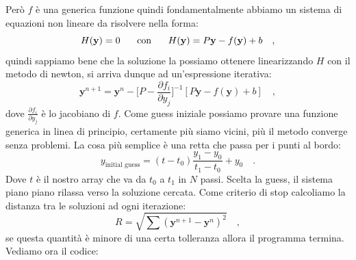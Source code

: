 \documentclass[10pt,a4paper]{article}
\begin{document}
Però $f$ è una generica funzione quindi fondamentalmente abbiamo un sistema di equazioni non lineare da risolvere nella forma:
\begin{equation}
H(\textbf{y}) = 0 \hspace{5 mm} \text{ con } \hspace{5 mm} H(\textbf{y}) = P \textbf{y} - f(\textbf{y}) + b \quad,
\end{equation}
quindi sappiamo bene che la soluzione la possiamo ottenere linearizzando $H$ con il metodo di newton, si arriva dunque ad un'espressione iterativa:
\begin{equation}
\textbf{y}^{n+1} = \textbf{y}^{n} - \Bigg[ P - \frac{\partial f_i}{\partial y_j} \Bigg]^{-1} [P \textbf{y} - f(\textbf{y}) + b] \quad,
\end{equation}
dove $\frac{\partial f_i}{\partial y_j}$ è lo jacobiano di $f$. Come guess iniziale possiamo provare una funzione generica in linea di principio, certamente più siamo vicini, più il metodo converge senza problemi. La cosa più semplice è una retta che passa per i punti al bordo:
\begin{equation}
y_{\text{initial guess}} = (t - t_0) \frac{y_1 - y_0}{t_1 - t_0} + y_0 \quad.
\end{equation}  
Dove $t$ è il nostro array che va da $t_0$ a $t_1$ in $N$ passi. Scelta la guess, il sistema piano piano rilassa verso la soluzione cercata. Come criterio di stop calcoliamo la distanza tra le soluzioni ad ogni iterazione:
\begin{equation}
R = \sqrt{\sum(\textbf{y}^{n+1} - \textbf{y}^n)^2} \quad,
\end{equation}
se questa quantità è minore di una certa tolleranza allora il programma termina. Vediamo ora il codice:
\end{document}
